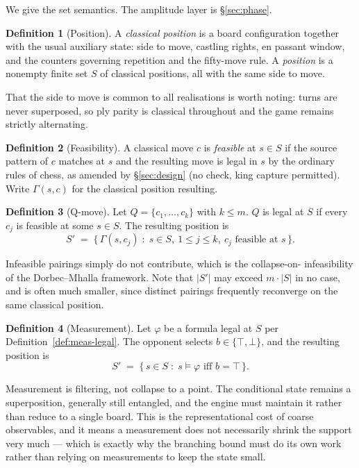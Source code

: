 \documentclass[11pt,a4paper]{article}
\theoremstyle{definition}
\newtheorem{definition}{Definition}[section]
\theoremstyle{plain}
\begin{document}
We give the set semantics. The amplitude layer is \S\ref{sec:phase}.

\begin{definition}[Position]
A \emph{classical position} is a board configuration together with the usual
auxiliary state: side to move, castling rights, en passant window, and the
counters governing repetition and the fifty-move rule. A \emph{position} is a
nonempty finite set $S$ of classical positions, all with the same side to move.
\end{definition}

That the side to move is common to all realisations is worth noting: turns are
never superposed, so ply parity is classical throughout and the game remains
strictly alternating.

\begin{definition}[Feasibility]
A classical move $c$ is \emph{feasible} at $s\in S$ if the source pattern of
$c$ matches at $s$ and the resulting move is legal in $s$ by the ordinary rules
of chess, as amended by \S\ref{sec:design} (no check, king capture permitted).
Write $\Gamma(s,c)$ for the classical position resulting.
\end{definition}

\begin{definition}[Q-move]
Let $Q = \{c_1,\dots,c_k\}$ with $k\le m$. $Q$ is legal at $S$ if every $c_j$
is feasible at some $s\in S$. The resulting position is
\[
  S' \;=\; \{\, \Gamma(s,c_j) \;:\; s\in S,\ 1\le j\le k,\
                c_j \text{ feasible at } s \,\}.
\]
\end{definition}

Infeasible pairings simply do not contribute, which is the collapse-on-
infeasibility of the Dorbec--Mhalla framework. Note that $|S'|$ may exceed
$m\cdot|S|$ in no case, and is often much smaller, since distinct pairings
frequently reconverge on the same classical position.

\begin{definition}[Measurement]
Let $\varphi$ be a formula legal at $S$ per Definition~\ref{def:meas-legal}.
The opponent selects $b\in\{\top,\bot\}$, and the resulting position is
\[
  S' \;=\; \{\, s \in S \;:\; s \models \varphi \text{ iff } b = \top \,\}.
\]
\end{definition}

Measurement is filtering, not collapse to a point. The conditional state
remains a superposition, generally still entangled, and the engine must
maintain it rather than reduce to a single board. This is the representational
cost of coarse observables, and it means a measurement does not necessarily
shrink the support very much --- which is exactly why the branching bound must
do its own work rather than relying on measurements to keep the state small.
\end{document}
